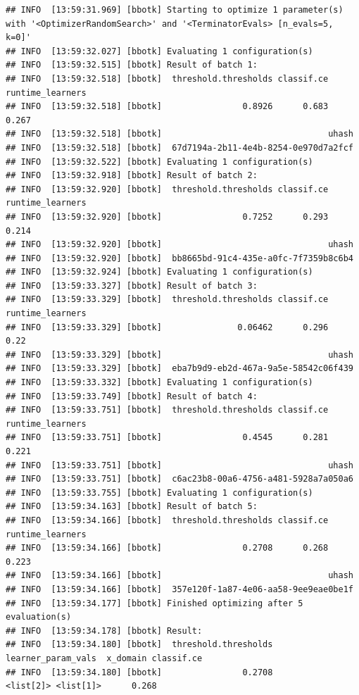 \documentclass[
]{scrbook}
\begin{document}
\begin{verbatim}
## INFO  [13:59:31.969] [bbotk] Starting to optimize 1 parameter(s) with '<OptimizerRandomSearch>' and '<TerminatorEvals> [n_evals=5, k=0]' 
## INFO  [13:59:32.027] [bbotk] Evaluating 1 configuration(s) 
## INFO  [13:59:32.515] [bbotk] Result of batch 1: 
## INFO  [13:59:32.518] [bbotk]  threshold.thresholds classif.ce runtime_learners 
## INFO  [13:59:32.518] [bbotk]                0.8926      0.683            0.267 
## INFO  [13:59:32.518] [bbotk]                                 uhash 
## INFO  [13:59:32.518] [bbotk]  67d7194a-2b11-4e4b-8254-0e970d7a2fcf 
## INFO  [13:59:32.522] [bbotk] Evaluating 1 configuration(s) 
## INFO  [13:59:32.918] [bbotk] Result of batch 2: 
## INFO  [13:59:32.920] [bbotk]  threshold.thresholds classif.ce runtime_learners 
## INFO  [13:59:32.920] [bbotk]                0.7252      0.293            0.214 
## INFO  [13:59:32.920] [bbotk]                                 uhash 
## INFO  [13:59:32.920] [bbotk]  bb8665bd-91c4-435e-a0fc-7f7359b8c6b4 
## INFO  [13:59:32.924] [bbotk] Evaluating 1 configuration(s) 
## INFO  [13:59:33.327] [bbotk] Result of batch 3: 
## INFO  [13:59:33.329] [bbotk]  threshold.thresholds classif.ce runtime_learners 
## INFO  [13:59:33.329] [bbotk]               0.06462      0.296             0.22 
## INFO  [13:59:33.329] [bbotk]                                 uhash 
## INFO  [13:59:33.329] [bbotk]  eba7b9d9-eb2d-467a-9a5e-58542c06f439 
## INFO  [13:59:33.332] [bbotk] Evaluating 1 configuration(s) 
## INFO  [13:59:33.749] [bbotk] Result of batch 4: 
## INFO  [13:59:33.751] [bbotk]  threshold.thresholds classif.ce runtime_learners 
## INFO  [13:59:33.751] [bbotk]                0.4545      0.281            0.221 
## INFO  [13:59:33.751] [bbotk]                                 uhash 
## INFO  [13:59:33.751] [bbotk]  c6ac23b8-00a6-4756-a481-5928a7a050a6 
## INFO  [13:59:33.755] [bbotk] Evaluating 1 configuration(s) 
## INFO  [13:59:34.163] [bbotk] Result of batch 5: 
## INFO  [13:59:34.166] [bbotk]  threshold.thresholds classif.ce runtime_learners 
## INFO  [13:59:34.166] [bbotk]                0.2708      0.268            0.223 
## INFO  [13:59:34.166] [bbotk]                                 uhash 
## INFO  [13:59:34.166] [bbotk]  357e120f-1a87-4e06-aa58-9ee9eae0be1f 
## INFO  [13:59:34.177] [bbotk] Finished optimizing after 5 evaluation(s) 
## INFO  [13:59:34.178] [bbotk] Result: 
## INFO  [13:59:34.180] [bbotk]  threshold.thresholds learner_param_vals  x_domain classif.ce 
## INFO  [13:59:34.180] [bbotk]                0.2708          <list[2]> <list[1]>      0.268
\end{verbatim}
\end{document}
